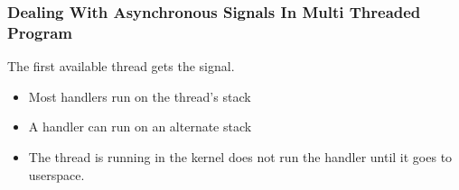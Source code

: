 % 
\begin{frame}[fragile]
    \frametitle{Dealing With Asynchronous Signals In Multi Threaded Program}
The first available thread gets the signal. \pause
    \begin{itemize}
        \item Most handlers run on the thread's stack
        \item A handler can run on an alternate stack \pause
        \item The thread is running in the kernel does not run the handler until it goes to userspace.
    \end{itemize}
\end{frame}
% 
% 
